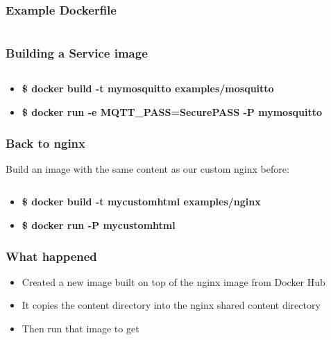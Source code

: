 \documentclass[aspectratio=169,11pt,hyperref={colorlinks=true}]{beamer}
\begin{document}
\begin{frame}
    \frametitle{Example Dockerfile}
    \inputminted[fontsize=\small,breaklines,linenos,frame=single]{dockerfile}{examples/uwsgi/Dockerfile}
\end{frame}

\begin{frame}
    \frametitle{Building a Service image}
    \inputminted[fontsize=\scriptsize,breaklines,linenos,frame=single]{dockerfile}{examples/mosquitto/Dockerfile}
    \begin{itemize}
        \item \textbf{\$ docker build -t mymosquitto examples/mosquitto}
        \item \textbf{\$ docker run -e MQTT\_PASS=SecurePASS -P mymosquitto}
    \end{itemize}
\end{frame}


\begin{frame}
    \frametitle{Back to nginx}
    Build an image with the same content as our custom nginx before:
    \inputminted[fontsize=\large,breaklines,linenos,frame=single]{dockerfile}{examples/nginx/Dockerfile}
    \begin{itemize}
        \item {\large \textbf{\$ docker build -t mycustomhtml examples/nginx}}
        \item {\large \textbf{\$ docker run -P mycustomhtml}}
    \end{itemize}
\end{frame}

\begin{frame}
    \frametitle{What happened}
    \begin{itemize}
        \item Created a new image built on top of the nginx image from Docker Hub
        \item It copies the content directory into the nginx shared content directory
        \item Then run that image to get
    \end{itemize}

\end{frame}
\end{document}
